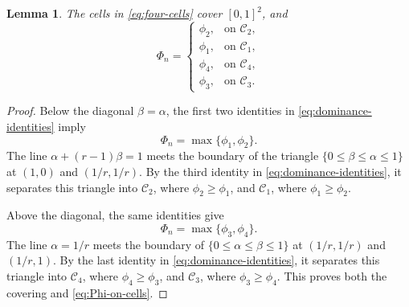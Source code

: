 \documentclass[11pt,letterpaper]{amsart}
\numberwithin{equation}{section}
\newtheorem{lemma}[lemma]{Lemma}
\theoremstyle{definition}
\theoremstyle{remark}
\begin{document}
\begin{lemma}
\label{lem:four-cells}
The cells in \eqref{eq:four-cells} cover $[0,1]^2$, and
\begin{equation}\label{eq:Phi-on-cells}
 \Phi_n=
 \begin{cases}
  \phi_2,&\text{on }\mathcal C_2,\\
  \phi_1,&\text{on }\mathcal C_1,\\
  \phi_4,&\text{on }\mathcal C_4,\\
  \phi_3,&\text{on }\mathcal C_3.
 \end{cases}
\end{equation}
\end{lemma}

\begin{proof}
Below the diagonal $\beta=\alpha$, the first two identities in
\eqref{eq:dominance-identities} imply
\[
 \Phi_n=\max\{\phi_1,\phi_2\}.
\]
The line $\alpha+(r-1)\beta=1$ meets the boundary of the triangle
$\{0\leq\beta\leq\alpha\leq1\}$ at $(1,0)$ and $(1/r,1/r)$.  By the third identity in
\eqref{eq:dominance-identities}, it separates this triangle into
$\mathcal C_2$, where $\phi_2\geq \phi_1$, and $\mathcal C_1$, where
$\phi_1\geq \phi_2$.

Above the diagonal, the same identities give
\[
 \Phi_n=\max\{\phi_3,\phi_4\}.
\]
The line $\alpha=1/r$ meets the boundary of
$\{0\leq\alpha\leq\beta\leq1\}$ at $(1/r,1/r)$ and $(1/r,1)$.  By the last identity in
\eqref{eq:dominance-identities}, it separates this triangle into
$\mathcal C_4$, where $\phi_4\geq \phi_3$, and $\mathcal C_3$, where $\phi_3\geq \phi_4$.  This proves both the covering and
\eqref{eq:Phi-on-cells}.
\end{proof}
\end{document}
